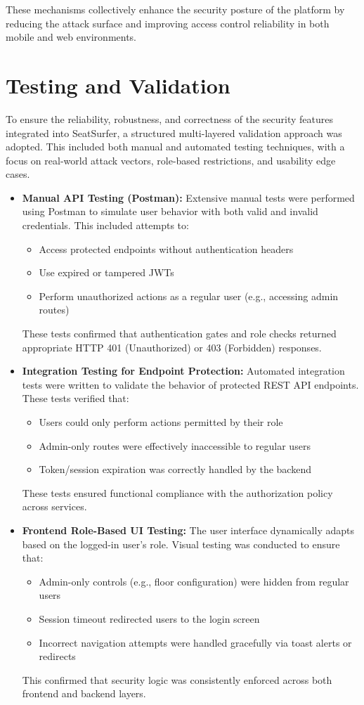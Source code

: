 \documentclass[12pt,a4paper]{report} %
\begin{document}
These mechanisms collectively enhance the security posture of the platform by reducing the attack surface and improving access control reliability in both mobile and web environments.

\section{Testing and Validation}

To ensure the reliability, robustness, and correctness of the security features integrated into SeatSurfer, a structured multi-layered validation approach was adopted. This included both manual and automated testing techniques, with a focus on real-world attack vectors, role-based restrictions, and usability edge cases.

\begin{itemize}
\item \textbf{Manual API Testing (Postman):}
Extensive manual tests were performed using Postman to simulate user behavior with both valid and invalid credentials. This included attempts to:
\begin{itemize}
\item Access protected endpoints without authentication headers
\item Use expired or tampered JWTs
\item Perform unauthorized actions as a regular user (e.g., accessing admin routes)
\end{itemize}
These tests confirmed that authentication gates and role checks returned appropriate HTTP 401 (Unauthorized) or 403 (Forbidden) responses.

\item \textbf{Integration Testing for Endpoint Protection:}  
Automated integration tests were written to validate the behavior of protected REST API endpoints. These tests verified that:
\begin{itemize}
    \item Users could only perform actions permitted by their role
    \item Admin-only routes were effectively inaccessible to regular users
    \item Token/session expiration was correctly handled by the backend
\end{itemize}
These tests ensured functional compliance with the authorization policy across services.

\item \textbf{Frontend Role-Based UI Testing:}  
The user interface dynamically adapts based on the logged-in user's role. Visual testing was conducted to ensure that:
\begin{itemize}
    \item Admin-only controls (e.g., floor configuration) were hidden from regular users
    \item Session timeout redirected users to the login screen
    \item Incorrect navigation attempts were handled gracefully via toast alerts or redirects
\end{itemize}
This confirmed that security logic was consistently enforced across both frontend and backend layers.


\end{itemize}
\end{document}
